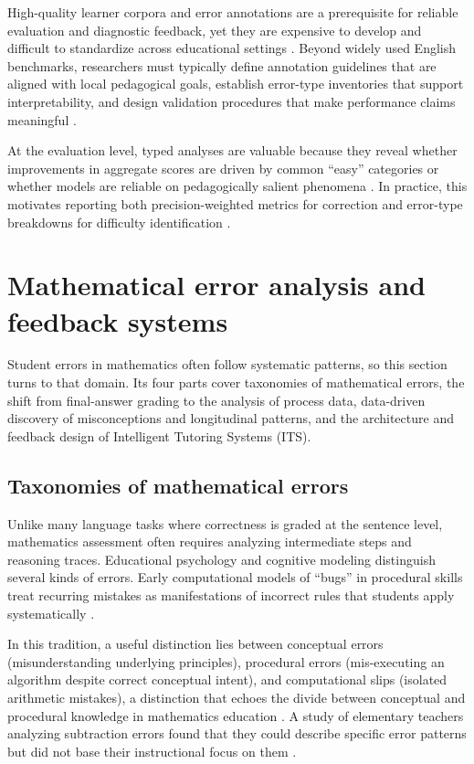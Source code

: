 High-quality learner corpora and error annotations are a prerequisite for reliable evaluation and diagnostic feedback, yet they are expensive to develop and difficult to standardize across educational settings \parencite{Bryant2023GECsurvey,Ng2014}. Beyond widely used English benchmarks, researchers must typically define annotation guidelines that are aligned with local pedagogical goals, establish error-type inventories that support interpretability, and design validation procedures that make performance claims meaningful \parencite{Bryant2023GECsurvey,Woolf2010}.

At the evaluation level, typed analyses are valuable because they reveal whether improvements in aggregate scores are driven by common ``easy'' categories or whether models are reliable on pedagogically salient phenomena \parencite{BryantFeliceBriscoe2017,Bryant2019}. In practice, this motivates reporting both precision-weighted metrics for correction and error-type breakdowns for difficulty identification \parencite{DahlmeierNg2012,Ng2014}.

\section{Mathematical error analysis and feedback systems}
\label{sec:sota_math}

Student errors in mathematics often follow systematic patterns, so this section turns to that domain. Its four parts cover taxonomies of mathematical errors, the shift from final-answer grading to the analysis of process data, data-driven discovery of misconceptions and longitudinal patterns, and the architecture and feedback design of Intelligent Tutoring Systems (ITS).

\subsection{Taxonomies of mathematical errors}
\label{sec:sota_math_tax}

Unlike many language tasks where correctness is graded at the sentence level, mathematics assessment often requires analyzing intermediate steps and reasoning traces. Educational psychology and cognitive modeling distinguish several kinds of errors. Early computational models of ``bugs'' in procedural skills treat recurring mistakes as manifestations of incorrect rules that students apply systematically \parencite{BrownBurton1978,VanLehn1990}.

In this tradition, a useful distinction lies between conceptual errors (misunderstanding underlying principles), procedural errors (mis-executing an algorithm despite correct conceptual intent), and computational slips (isolated arithmetic mistakes), a distinction that echoes the divide between conceptual and procedural knowledge in mathematics education \parencite{VanLehn1990,RittleJohnson2015}. A study of elementary teachers analyzing subtraction errors found that they could describe specific error patterns but did not base their instructional focus on them \parencite{Riccomini2005}.


